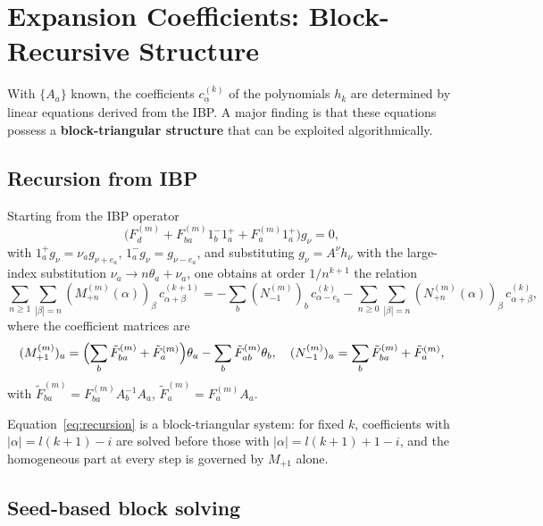 \documentclass[12pt]{article}
\begin{document}
\section{Expansion Coefficients: Block-Recursive Structure}\label{sec:expansion}

With $\{A_a\}$ known, the coefficients $c_{\underline\alpha}^{(k)}$ of the
polynomials $h_k$ are determined by linear equations derived from the IBP.
A major finding is that these equations possess a \textbf{block-triangular
structure} that can be exploited algorithmically.

\subsection{Recursion from IBP}

Starting from the IBP operator
\[
  \bigl(F_d^{(m)}+F_{ba}^{(m)}1_b^{-}1_a^{+}+F_a^{(m)}1_a^{+}\bigr)g_{\nu}=0,
\tag{4.1}\label{eq:IBP_g}
\]
with $1_a^{+}g_{\nu}=\nu_a g_{\nu+e_a}$, $1_a^{-}g_{\nu}=g_{\nu-e_a}$, and
substituting $g_{\nu}=A^{\underline\nu}h_{\nu}$ with the large-index substitution
$\nu_a\to n\theta_a+\nu_a$, one obtains at order $1/n^{k+1}$ the relation
\[
  \sum_{n\ge1}\sum_{|\beta|=n}(M_{+n}^{(m)}(\alpha))_{\beta}\,
    c_{\alpha+\beta}^{(k+1)}
  = -\!\sum_{b}(N_{-1}^{(m)})_b\,c_{\alpha-e_b}^{(k)}
   -\!\sum_{n\ge0}\sum_{|\beta|=n}(N_{+n}^{(m)}(\alpha))_{\beta}\,
    c_{\alpha+\beta}^{(k)} ,
\tag{4.2}\label{eq:recursion}
\]
where the coefficient matrices are
\[
  (M_{+1}^{(m)})_a
    =\Bigl(\sum_b\tilde F_{ba}^{(m)}+\tilde F_a^{(m)}\Bigr)\theta_a
     -\sum_b\tilde F_{ab}^{(m)}\theta_b,
  \quad
  (N_{-1}^{(m)})_a
    =\sum_b\tilde F_{ba}^{(m)}+\tilde F_a^{(m)},
\]
with $\tilde F_{ba}^{(m)}=F_{ba}^{(m)}A_b^{-1}A_a$,
$\tilde F_a^{(m)}=F_a^{(m)}A_a$.

Equation~\eqref{eq:recursion} is a block-triangular system: for fixed $k$,
coefficients with $|\alpha|=l(k+1)-i$ are solved before those with
$|\alpha|=l(k+1)+1-i$, and the homogeneous part at every step is governed by
$M_{+1}$ alone.

\subsection{Seed-based block solving}\label{ssec:seed_block}
\end{document}
